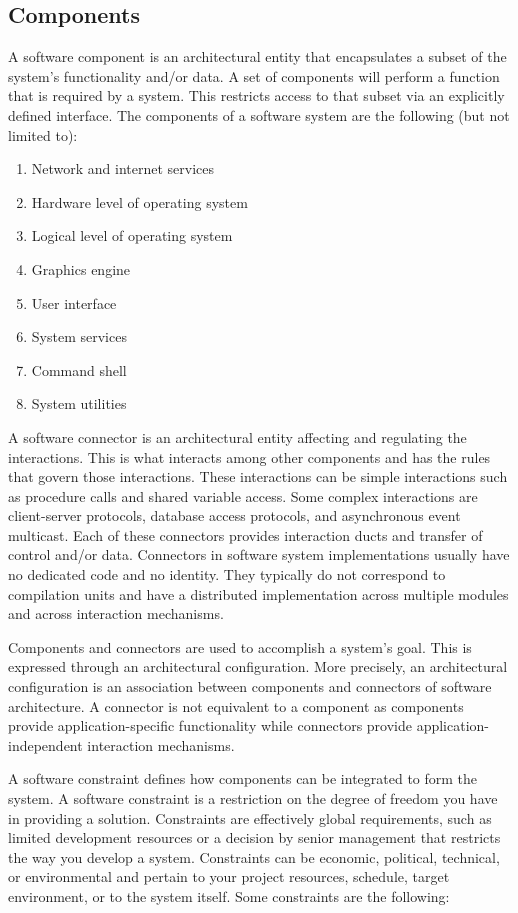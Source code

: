 \documentclass[preprint,11pt,3p]{article}
\begin{document}
\subsection{Components} 
A software component is an architectural entity that encapsulates a subset of the system’s functionality and/or data. A set of components will perform a function that is required by a system. This restricts access to that subset via an explicitly defined interface. The components of a software system are the following (but not limited to):
\begin{enumerate} 
	\item Network and internet services
	\item Hardware level of operating system
	\item Logical level of operating system
	\item Graphics engine
	\item User interface
	\item System services
	\item Command shell
	\item System utilities 
\end{enumerate} 
A software connector is an architectural entity affecting and regulating the interactions. This is what interacts among other components and has the rules that govern those interactions. These interactions can be simple interactions such as procedure calls and shared variable access.  Some complex interactions are client-server protocols, database access protocols, and asynchronous event multicast. Each of these connectors provides interaction ducts and transfer of control and/or data. Connectors in software system implementations usually have no dedicated code and no identity. They typically do not correspond to compilation units and have a distributed implementation across multiple modules and across interaction mechanisms. \par

Components and connectors are used to accomplish a system’s goal. This is expressed through an architectural configuration. More precisely, an architectural configuration is an association between components and connectors of software architecture. A connector is not equivalent to a component as components provide application-specific functionality while connectors provide application-independent interaction mechanisms. \par

A software constraint defines how components can be integrated to form the system. A software constraint is a restriction on the degree of freedom you have in providing a solution. Constraints are effectively global requirements, such as limited development resources or a decision by senior management that restricts the way you develop a system. Constraints can be economic, political, technical, or environmental and pertain to your project resources, schedule, target environment, or to the system itself. Some constraints are the following:
\end{document}
